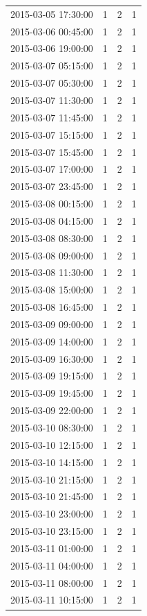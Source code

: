 \begin{tabular}{lrrr}
2015-03-05 17:30:00 & 1 & 2 & 1 \\
2015-03-06 00:45:00 & 1 & 2 & 1 \\
2015-03-06 19:00:00 & 1 & 2 & 1 \\
2015-03-07 05:15:00 & 1 & 2 & 1 \\
2015-03-07 05:30:00 & 1 & 2 & 1 \\
2015-03-07 11:30:00 & 1 & 2 & 1 \\
2015-03-07 11:45:00 & 1 & 2 & 1 \\
2015-03-07 15:15:00 & 1 & 2 & 1 \\
2015-03-07 15:45:00 & 1 & 2 & 1 \\
2015-03-07 17:00:00 & 1 & 2 & 1 \\
2015-03-07 23:45:00 & 1 & 2 & 1 \\
2015-03-08 00:15:00 & 1 & 2 & 1 \\
2015-03-08 04:15:00 & 1 & 2 & 1 \\
2015-03-08 08:30:00 & 1 & 2 & 1 \\
2015-03-08 09:00:00 & 1 & 2 & 1 \\
2015-03-08 11:30:00 & 1 & 2 & 1 \\
2015-03-08 15:00:00 & 1 & 2 & 1 \\
2015-03-08 16:45:00 & 1 & 2 & 1 \\
2015-03-09 09:00:00 & 1 & 2 & 1 \\
2015-03-09 14:00:00 & 1 & 2 & 1 \\
2015-03-09 16:30:00 & 1 & 2 & 1 \\
2015-03-09 19:15:00 & 1 & 2 & 1 \\
2015-03-09 19:45:00 & 1 & 2 & 1 \\
2015-03-09 22:00:00 & 1 & 2 & 1 \\
2015-03-10 08:30:00 & 1 & 2 & 1 \\
2015-03-10 12:15:00 & 1 & 2 & 1 \\
2015-03-10 14:15:00 & 1 & 2 & 1 \\
2015-03-10 21:15:00 & 1 & 2 & 1 \\
2015-03-10 21:45:00 & 1 & 2 & 1 \\
2015-03-10 23:00:00 & 1 & 2 & 1 \\
2015-03-10 23:15:00 & 1 & 2 & 1 \\
2015-03-11 01:00:00 & 1 & 2 & 1 \\
2015-03-11 04:00:00 & 1 & 2 & 1 \\
2015-03-11 08:00:00 & 1 & 2 & 1 \\
2015-03-11 10:15:00 & 1 & 2 & 1 \\

\end{tabular}
